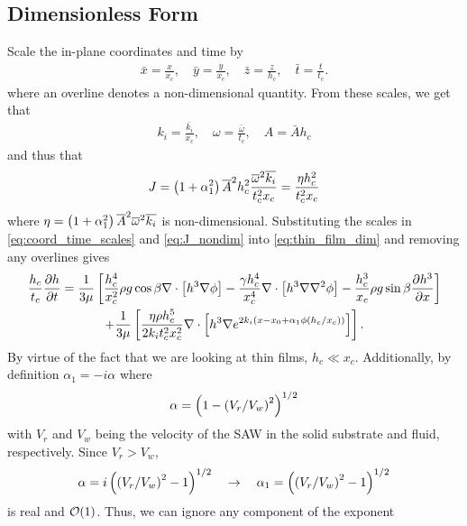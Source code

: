 \subsection{Dimensionless Form}
Scale the in-plane coordinates and time by 
\begin{gather}
    \bar{x} = \frac{x}{x_c}, \quad \bar{y} = \frac{y}{x_c}, \quad \bar{z} = \frac{z}{h_c}, \quad \bar{t} = \frac{t}{t_c}. 
    \label{eq:coord_time_scales}
\end{gather}
where an overline denotes a non-dimensional quantity. From these scales, we get that  
\begin{gather*}
    k_i = \frac{\bar{k_i}}{x_c}, \quad \omega = \frac{\bar{\omega}}{t_c}, \quad A = \bar{A}h_c
\end{gather*}
and thus that 
\begin{align}
    J = \left( 1 + \alpha_1^2 \right)  \overline{A}^2 h_c^2 \frac{\overline{\omega}^2 \overline{k_i}}{t_c^2 x_c} = \frac{\eta h_c^2}{t_c^2 x_c}
    \label{eq:J_nondim}
\end{align}
where $\eta = \left( 1 + \alpha_1^2 \right)  \overline{A}^2 \overline{\omega}^2 \overline{k_i}$ is non-dimensional. Substituting the scales in 
\cref{eq:coord_time_scales} and \cref{eq:J_nondim} into \cref{eq:thin_film_dim} and removing any overlines gives 
\begin{multline}
    \frac{h_c}{t_c} \frac{\partial h}{\partial t} = \frac{1}{3\mu} \left[ 
        \frac{h_c^4}{x_c^2} \rho g \cos \beta \nabla \cdot \left[ h^3\nabla\phi \right] - 
        \frac{\gamma h_c^4}{x_c^4} \nabla \cdot \left[ h^3 \nabla \nabla^2 \phi \right] - 
        \frac{h_c^3}{x_c} \rho g \sin\beta \frac{\partial h^3}{\partial x}
     \right]\\
    + \frac{1}{3\mu} \left[  
        \frac{\eta \rho h_c^5}{2k_i t_c^2 x_c^2} \nabla \cdot \left[ h^3 \nabla e^{2k_i \left( x - x_0 + \alpha_1 \phi \left( h_c/x_c \right) \right)} \right]
     \right].
\label{eq:nondim_first}
\end{multline}
By virtue of the fact that we are looking at thin films, $h_c \ll x_c$. Additionally, by definition
$\alpha_1 = -i \alpha$ where 
\begin{equation*}
    \alpha = \left( 1 - \left( V_r/V_w \right)^2 \right)^{1/2}
\end{equation*}
with $V_r$ and $V_w$ being the velocity of the SAW in the solid substrate and fluid, respectively. Since 
$V_r > V_w$, 
\begin{equation*}
    \alpha = i \left( \left( V_r/V_w \right)^2 - 1 \right)^{1/2} \quad \rightarrow \quad \alpha_1 = \left( \left( V_r/V_w \right)^2 - 1 \right)^{1/2}
\end{equation*}
is real and $\operatorname{\mathcal{O}}\!\left(1\right)$. Thus, we can ignore any component of the exponent 
